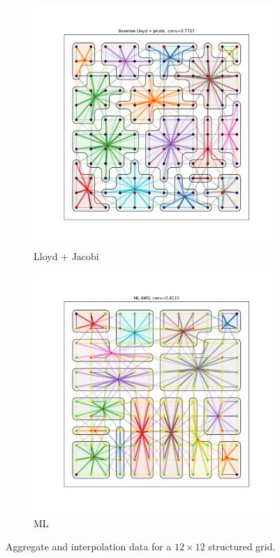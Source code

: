 \documentclass{article}
\begin{document}
\begin{figure}[h]
  \centering
  \begin{subfigure}[t]{0.49\textwidth}
    \centering
    \includegraphics[width=\textwidth]{grid_12_lloyd.pdf}
    \caption{Lloyd + Jacobi}
  \end{subfigure}
  \begin{subfigure}[t]{0.49\textwidth}
    \centering
    \includegraphics[width=\textwidth]{grid_12_ml.pdf}
    \caption{ML}
  \end{subfigure}
  \caption{Aggregate and interpolation data for a $12 \times 12$ structured grid.}
  \label{fig:grid12}
\end{figure}
\end{document}
